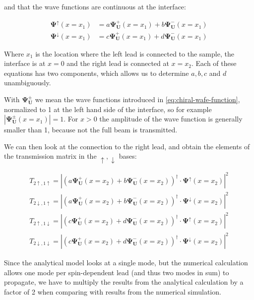 and that the wave functions are continuous at the interface:

\begin{align*}
    \mathbf{\Psi^\uparrow}(x=x_1) &=
        a \mathbf{\Psi^+_U}(x=x_1) + b  \mathbf{\Psi^-_U}(x=x_1)\\
    \mathbf{\Psi^\downarrow}(x=x_1) &=
        c \mathbf{\Psi^+_U}(x=x_1) + d  \mathbf{\Psi^-_U}(x=x_1)
\end{align*}

Where $x_1$ is the location where the left lead is connected to the sample, the
interface is at $x = 0$ and the right lead is connected at $x = x_2$.
Each of these equations has two components, which allows us to determine
$a, b, c$ and $d$ unambiguously.

With $\mathbf{\Psi^\pm_U}$ we mean the wave functions introduced in
\ref{eq:chiral-wafe-function}, normalized to 1 at the
left hand side of the interface, so for example
$|\mathbf{\Psi^\pm_U}(x=x_1)|=1$. For $x>0$ the amplitude of the wave function
is generally smaller than 1, because not the full beam is transmitted.

We can then look at the connection to the right lead, and obtain the 
elements of the transmission matrix in the $\uparrow, \downarrow$ bases:

\begin{align}
    T_{2\uparrow,1\uparrow} = \left| \left( 
        a \mathbf{\Psi^+_U}(x=x_2) + b  \mathbf{\Psi^-_U}(x=x_2)
    \right)^\dagger \cdot \mathbf{\Psi}^\uparrow(x=x_2) \right|^2\\
    T_{2\downarrow,1\uparrow} = \left| \left( 
        a \mathbf{\Psi^+_U}(x=x_2) + b  \mathbf{\Psi^-_U}(x=x_2)
    \right)^\dagger \cdot \mathbf{\Psi}^\downarrow(x=x_2) \right|^2\\
    T_{2\uparrow,1\downarrow} = \left| \left( 
        c \mathbf{\Psi^+_U}(x=x_2) + d  \mathbf{\Psi^-_U}(x=x_2)
    \right)^\dagger \cdot \mathbf{\Psi}^\uparrow(x=x_2) \right|^2\\
    T_{2\downarrow,1\downarrow} = \left| \left( 
        c \mathbf{\Psi^+_U}(x=x_2) + d  \mathbf{\Psi^-_U}(x=x_2)
    \right)^\dagger \cdot \mathbf{\Psi}^\downarrow(x=x_2) \right|^2
\end{align}

Since the analytical model looks at a single mode, but the numerical
calculation allows one mode per spin-dependent lead (and thus two modes in
sum) to propagate, we have to multiply the results from the analytical
calculation by a factor of 2 when comparing with results from the numerical
simulation.

